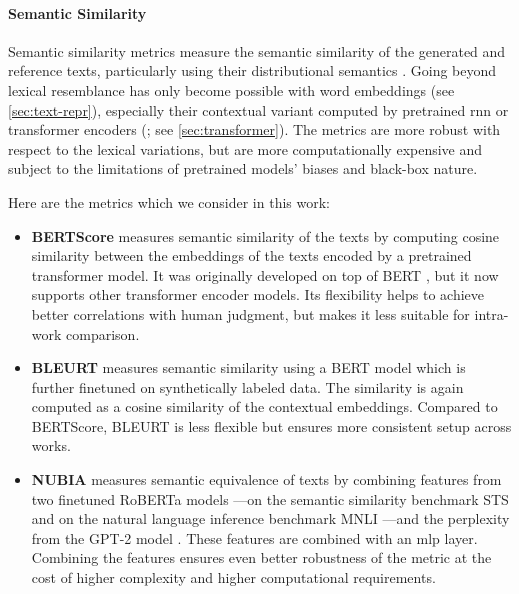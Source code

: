 {\paragraph{Semantic Similarity} Semantic similarity metrics measure the semantic similarity of the generated and reference texts, particularly using their distributional semantics . Going beyond lexical resemblance has only become possible with word embeddings (see \autoref{sec:text-repr}), especially their contextual variant computed by pretrained \ac{rnn} or transformer encoders (\citealp{peters2018deep,devlinBERTPretrainingDeep2019}; see \autoref{sec:transformer}). The metrics are more robust with respect to the lexical variations, but are more computationally expensive and subject to the limitations of pretrained models' biases and black-box nature.

Here are the metrics which we consider in this work:

\begin{itemize}
  \item \textbf{BERTScore} \cite{zhang2019bertscore} measures semantic similarity of the texts by computing cosine similarity between the embeddings of the texts encoded by a pretrained transformer model. It was originally developed on top of BERT \cite{devlinBERTPretrainingDeep2019}, but it now supports other transformer encoder models. Its flexibility helps to achieve better correlations with human judgment, but makes it less suitable for intra-work comparison.
  \item \textbf{BLEURT} \cite{sellam2020bleurt} measures semantic similarity using a BERT model \cite{devlinBERTPretrainingDeep2019} which is further finetuned on synthetically labeled data. The similarity is again computed as a cosine similarity of the contextual embeddings. Compared to BERTScore, BLEURT is less flexible but ensures more consistent setup across works.
  \item \textbf{NUBIA} \cite{kaneNUBIANeUralBased2020} measures semantic equivalence of texts by combining features from two finetuned RoBERTa models \cite{liuRoBERTaRobustlyOptimized2019}---on the semantic similarity benchmark STS \cite{cer-etal-2017-semeval} and on the natural language inference benchmark MNLI \cite{williams2018mnli}---and the perplexity from the GPT-2 model \cite{radford2019language}. These features are combined with an \ac{mlp} layer. Combining the features ensures even better robustness of the metric at the cost of higher complexity and higher computational requirements.
\end{itemize}

}
